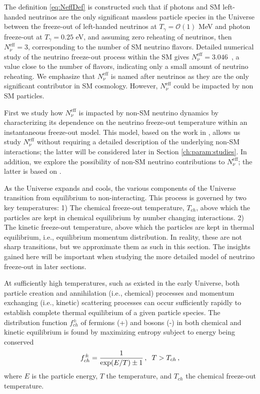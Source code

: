 The definition \ref{eq:NeffDef} is constructed such that if photons and SM left-handed neutrinos are the only significant massless particle species in the Universe between the freeze-out of left-handed neutrinos at $T_\gamma=\mathcal{O}(1)$ MeV and photon freeze-out at $T_\gamma=0.25$ eV, and assuming zero reheating of neutrinos, then $N^{\text{eff}}_{\nu}=3$, corresponding to the number of SM neutrino flavors. Detailed numerical study of the neutrino freeze-out process within the SM gives $N^{\text{eff}}_{\nu}=3.046$~\cite{Mangano:2005cc}, a value close to the number of flavors, indicating only a small amount of neutrino reheating. 
 We emphasize that $N^{\text{eff}}_\nu$ is named after neutrinos as they are the only significant contributor in SM cosmology. However, $N^{\text{eff}}_\nu$ could be impacted by non SM particles.

First we study how $N^{\text{eff}}_{\nu}$ is impacted by non-SM neutrino dynamics by characterizing its dependence on the neutrino freeze-out temperature within an instantaneous freeze-out model. This model, based on the work in \cite{Birrell:2013gpa,Birrell:2012gg}, allows us study $N^{\text{eff}}_{\nu}$ without requiring a detailed description of the underlying non-SM interactions; the latter will be considered later in Section \ref{ch:param:studies}. In addition, we explore the possibility of non-SM neutrino contributions to $N^{\text{eff}}_\nu$; the latter is based on \cite{Birrell:2014cja}.


As the Universe expands and cools, the various components of the Universe transition from equilibrium to non-interacting. This process is governed by two key temperatures: 1) The chemical freeze-out temperature, $T_{ch}$, above which the particles are kept in chemical equilibrium by number changing interactions. 2) The kinetic freeze-out temperature, above which the particles are kept in thermal equilibrium, i.e., equilibrium momentum distribution. In reality, these are not sharp transitions, but we approximate them as such in this section. The insights gained here will be important when studying the more detailed model of neutrino freeze-out in later sections.

At sufficiently high temperatures, such as existed in the early Universe, both particle creation and annihilation (i.e., chemical) processes and momentum exchanging (i.e., kinetic) scattering processes can occur sufficiently rapidly to establish complete thermal equilibrium of a given particle species. The distribution function $f_{ch}^\pm$ of fermions (+) and bosons (-) in both chemical and kinetic equilibrium is found by maximizing entropy subject to energy being conserved
\begin{equation}\label{eq:ChEq}
f_{ch}^\pm=\frac{1}{\exp(E/T)\pm 1}\,, \hspace{2mm} T>T_{ch}\,,
\end{equation}
where $E$ is the particle energy, $T$ the temperature, and $T_{ch}$ the chemical freeze-out temperature. 

